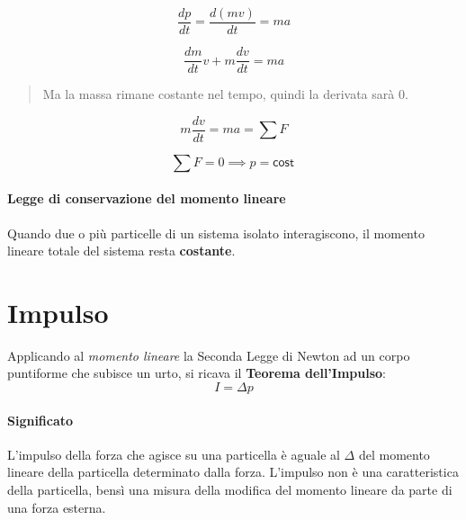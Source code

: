         \begin{equation*}
            \frac{dp}{dt} = \frac{d(mv)}{dt} = ma
        \end{equation*}

        \begin{equation*}
            \frac{dm}{dt} v + m \frac{dv}{dt} = ma
        \end{equation*}

        \begin{quote}
            Ma la massa rimane costante nel tempo, quindi la derivata sarà 0.
        \end{quote}

        \begin{equation*}
            m\frac{dv}{dt} = ma = \sum F
        \end{equation*}

        \begin{equation*}
            \sum F = 0 \implies p = \textsf{cost}\
        \end{equation*}

        \paragraph{Legge di conservazione del momento lineare} Quando due o più
        particelle di un sistema isolato interagiscono, il momento lineare 
        totale del sistema resta \textbf{costante}.


    \section{Impulso}
        Applicando al \textit{momento lineare} la Seconda Legge di Newton ad un
        corpo puntiforme che subisce un urto, si ricava il \textbf{Teorema
        dell'Impulso}:
        \begin{equation}
            I = \Delta p
        \end{equation}

        \paragraph{Significato} L'impulso della forza che agisce su una 
        particella è aguale al $\Delta$ del momento lineare della particella 
        determinato dalla forza. L'impulso non è una caratteristica della 
        particella, bensì una misura della modifica del momento lineare da 
        parte di una forza esterna.

